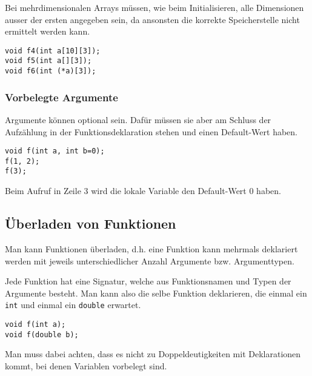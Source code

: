 \documentclass{article}
\newenvironment{code}
	{\begin{shaded}\vspace{-2.2mm}} 
	{\vspace{-5.0mm}\end{shaded}}
\begin{document}
\begin{multicols*}{3}
				Bei mehrdimensionalen Arrays müssen, wie beim Initialisieren, alle Dimensionen ausser der ersten angegeben sein, da ansonsten die korrekte Speicherstelle nicht ermittelt werden kann.
				\begin{code}
					\begin{lstlisting}[style=list]
void f4(int a[10][3]);
void f5(int a[][3]);
void f6(int (*a)[3]);
					\end{lstlisting}
				\end{code}
				
			
			\subsubsection{Vorbelegte Argumente} %
				Argumente können optional sein. Dafür müssen sie aber am Schluss der Aufzählung in der Funktionsdeklaration stehen und einen Default-Wert haben.
				\begin{code}
					\begin{lstlisting}[style=list]
void f(int a, int b=0);
f(1, 2);
f(3);
					\end{lstlisting}
				\end{code}
				Beim Aufruf in Zeile 3 wird die lokale Variable den Default-Wert 0 haben.
		
		\subsection{Überladen von Funktionen} %
			Man kann Funktionen überladen, d.h. eine Funktion kann mehrmals deklariert werden mit jeweils unterschiedlicher Anzahl Argumente bzw. Argumenttypen.
			
			Jede Funktion hat eine Signatur, welche aus Funktionsnamen und Typen der Argumente besteht. Man kann also die selbe Funktion deklarieren, die einmal ein \lstinline!int! und einmal ein \lstinline!double! erwartet.
			
			\begin{code}
				\begin{lstlisting}[style=list]
void f(int a);
void f(double b);
				\end{lstlisting}
			\end{code}
			
			Man muss dabei achten, dass es nicht zu Doppeldeutigkeiten mit Deklarationen kommt, bei denen Variablen vorbelegt sind.
		

\end{multicols*}
\end{document}
